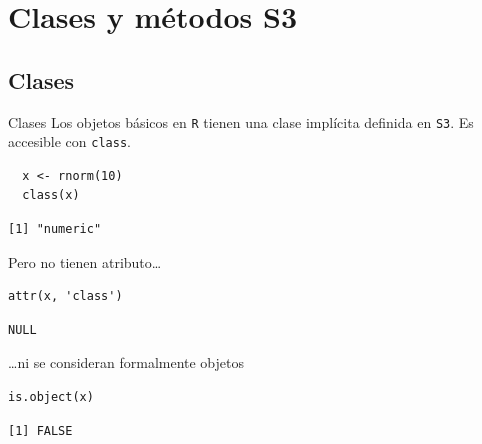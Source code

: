 \documentclass[xcolor={usenames,svgnames,dvipsnames}]{beamer}
\begin{document}
\section{Clases y métodos S3}
\label{sec:orga146f6c}

\subsection{Clases}
\label{sec:org7a7a4a6}
\begin{frame}[label={sec:orgfa1831a},fragile]{Clases}
 Los objetos básicos en \texttt{R} tienen una clase implícita definida en \texttt{S3}. Es accesible con \texttt{class}.
\lstset{language=r,label= ,caption= ,captionpos=b,numbers=none}
\begin{lstlisting}
  x <- rnorm(10)
  class(x)
\end{lstlisting}

\begin{verbatim}
[1] "numeric"
\end{verbatim}


Pero no tienen atributo\ldots{}
\lstset{language=r,label= ,caption= ,captionpos=b,numbers=none}
\begin{lstlisting}
attr(x, 'class')
\end{lstlisting}

\begin{verbatim}
NULL
\end{verbatim}


\ldots{}ni se consideran formalmente objetos
\lstset{language=r,label= ,caption= ,captionpos=b,numbers=none}
\begin{lstlisting}
is.object(x)
\end{lstlisting}

\begin{verbatim}
[1] FALSE
\end{verbatim}
\end{frame}
\end{document}
